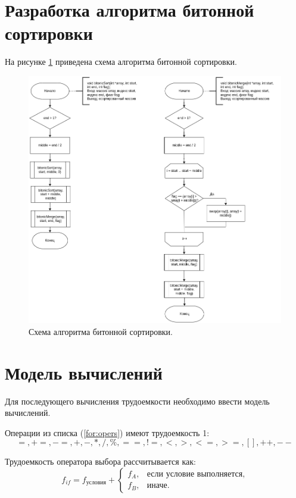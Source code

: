 \section{Разработка алгоритма битонной сортировки}
На рисунке \ref{img:bitonic} приведена схема алгоритма битонной сортировки.
\begin{figure}[h]
	\centering
	\includegraphics[width=175mm]{images/bitonic}
	\caption{Схема алгоритма битонной сортировки.}
	\label{img:bitonic}
\end{figure}

\section{Модель вычислений}

Для последующего вычисления трудоемкости необходимо ввести модель вычислений.

Операции из списка (\ref{for:opers}) имеют трудоемкость 1:
\begin{equation}
	\label{for:opers}
	=, +=, -=, +, -, *, /, \%, ==, !=, <, >, <=, >=, [], ++, {-}-
\end{equation}

Трудоемкость оператора выбора  рассчитывается как:
\begin{equation}
	\label{for:if}
	f_{if} = f_{\text{условия}} +
	\begin{cases}
		f_A, & \text{если условие выполняется,}\\
		f_B, & \text{иначе.}
	\end{cases}
\end{equation}

